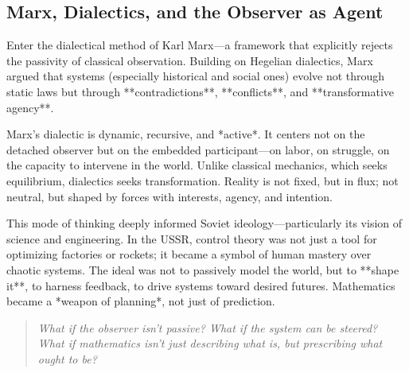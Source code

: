 \subsection{Marx, Dialectics, and the Observer as Agent}

Enter the dialectical method of Karl Marx—a framework that explicitly rejects the passivity of classical observation. Building on Hegelian dialectics, Marx argued that systems (especially historical and social ones) evolve not through static laws but through **contradictions**, **conflicts**, and **transformative agency**.

Marx's dialectic is dynamic, recursive, and *active*. It centers not on the detached observer but on the embedded participant—on labor, on struggle, on the capacity to intervene in the world. Unlike classical mechanics, which seeks equilibrium, dialectics seeks transformation. Reality is not fixed, but in flux; not neutral, but shaped by forces with interests, agency, and intention.

This mode of thinking deeply informed Soviet ideology—particularly its vision of science and engineering. In the USSR, control theory was not just a tool for optimizing factories or rockets; it became a symbol of human mastery over chaotic systems. The ideal was not to passively model the world, but to **shape it**, to harness feedback, to drive systems toward desired futures. Mathematics became a *weapon of planning*, not just of prediction.

\begin{quote}
\emph{What if the observer isn’t passive? What if the system can be steered? What if mathematics isn't just describing what is, but prescribing what ought to be?}
\end{quote}
